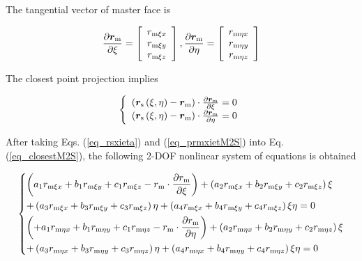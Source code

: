 The tangential vector of master face is

\begin{equation} \label{eq_prmxietM2S}
\frac{{\partial {{\bm{r}}_{\rm{m}}}}}{{\partial \xi }} = \left[ {\begin{array}{c}
  { r_{{\rm{m}} \xi x} } \\ 
  { r_{{\rm{m}} \xi y} } \\ 
  { r_{{\rm{m}} \xi z} } 
\end{array}} \right],\frac{{\partial {{\bm{r}}_{\rm{m}}}}}{{\partial \eta }} = \left[ {\begin{array}{c}
  { r_{{\rm{m}} \eta x} } \\ 
  { r_{{\rm{m}} \eta y} } \\ 
  { r_{{\rm{m}} \eta z} } 
\end{array}} \right]
\end{equation}

The closest point projection implies

\begin{equation} \label{eq_closestM2S}
\left\{ {\begin{array}{c}
  {\left( {{{\bm{r}}_{\rm{s}}} \left( {\xi ,\eta } \right)  - {{\bm{r}}_{\rm{m}}}} \right) \cdot \frac{{\partial {{\bm{r}}_{\rm{m}}} }}{{\partial \xi }} = 0} \\ 
  {\left( {{{\bm{r}}_{\rm{s}}} \left( {\xi ,\eta } \right)  - {{\bm{r}}_{\rm{m}}}} \right) \cdot \frac{{\partial {{\bm{r}}_{\rm{m}}} }}{{\partial \eta }} = 0} 
\end{array}} \right.
\end{equation}

After taking Eqs. (\ref{eq_rsxieta}) and (\ref{eq_prmxietM2S}) into Eq. (\ref{eq_closestM2S}), the following 2-DOF nonlinear system of equations is obtained

\begin{equation}
\left\{ \begin{gathered}
  \left( {{a_1}{r_{{\rm{m}}\xi x}} + {b_1}{r_{{\rm{m}}\xi y}} + {c_1}{r_{{\rm{m}}\xi z}} - {r_{\rm{m}}} \cdot \frac{{\partial {r_{\rm{m}}}}}{{\partial \xi }}} \right) + \left( {{a_2}{r_{{\rm{m}}\xi x}} + {b_2}{r_{{\rm{m}}\xi y}} + {c_2}{r_{{\rm{m}}\xi z}}} \right)\xi  \hfill \\
   + \left( {{a_3}{r_{{\rm{m}}\xi x}} + {b_3}{r_{{\rm{m}}\xi y}} + {c_3}{r_{{\rm{m}}\xi z}}} \right)\eta  + \left( {{a_4}{r_{{\rm{m}}\xi x}} + {b_4}{r_{{\rm{m}}\xi y}} + {c_4}{r_{{\rm{m}}\xi z}}} \right)\xi \eta  = 0 \hfill \\
  \left( { + {a_1}{r_{{\rm{m}}\eta x}} + {b_1}{r_{{\rm{m}}\eta y}} + {c_1}{r_{{\rm{m}}\eta z}} - {r_{\rm{m}}} \cdot \frac{{\partial {r_{\rm{m}}}}}{{\partial \eta }}} \right) + \left( {{a_2}{r_{{\rm{m}}\eta x}} + {b_2}{r_{{\rm{m}}\eta y}} + {c_2}{r_{{\rm{m}}\eta z}}} \right)\xi  \hfill \\
   + \left( {{a_3}{r_{{\rm{m}}\eta x}} + {b_3}{r_{{\rm{m}}\eta y}} + {c_3}{r_{{\rm{m}}\eta z}}} \right)\eta  + \left( {{a_4}{r_{{\rm{m}}\eta x}} + {b_4}{r_{{\rm{m}}\eta y}} + {c_4}{r_{{\rm{m}}\eta z}}} \right)\xi \eta  = 0 \hfill \\ 
\end{gathered}  \right.
\end{equation}

